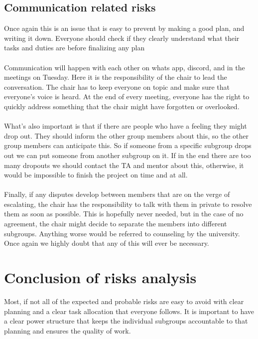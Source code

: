 \subsection{Communication related risks}
Once again this is an issue that is easy to prevent by making a good plan, and writing it down. Everyone should check if they clearly understand what their tasks and duties are before finalizing any plan\\\\ Communication will happen with each other on whats app, discord, and in the meetings on Tuesday. Here it is the responsibility of the chair to lead the conversation. The chair has to keep everyone on topic and make sure that everyone's voice is heard. At the end of every meeting, everyone has the right to quickly address something that the chair might have forgotten or overlooked.\\\\ What's also important is that if there are people who have a feeling they might drop out. They should inform the other group members about this, so the other group members can anticipate this. So if someone from a specific subgroup drops out we can put someone from another subgroup on it. If in the end there are too many dropouts we should contact the TA and mentor about this, otherwise, it would be impossible to finish the project on time and at all.\\\\ Finally, if any disputes develop between members that are on the verge of escalating, the chair has the responsibility to talk with them in private to resolve them as soon as possible. This is hopefully never needed, but in the case of no agreement, the chair might decide to separate the members into different subgroups. Anything worse would be referred to counseling by the university. Once again we highly doubt that any of this will ever be necessary.\\


\section{Conclusion of risks analysis}
Most, if not all of the expected and probable risks are easy to avoid with clear planning and a clear task allocation that everyone follows. It is important to have a clear power structure that keeps the individual subgroups accountable to that planning and ensures the quality of work.  